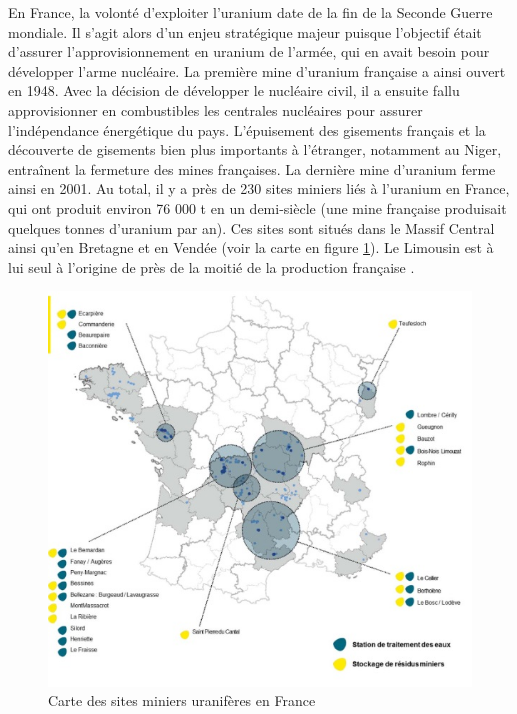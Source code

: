 \documentclass{article}
\begin{document}
En France, la volonté d’exploiter l’uranium date de la fin de la Seconde Guerre mondiale. Il s’agit alors d’un enjeu stratégique majeur puisque l’objectif était d’assurer l’approvisionnement en uranium de l’armée, qui en avait besoin pour développer l’arme nucléaire. La première mine d’uranium française a ainsi ouvert en 1948. Avec la décision de développer le nucléaire civil, il a ensuite fallu approvisionner en combustibles les centrales nucléaires pour assurer l’indépendance énergétique du pays. L’épuisement des gisements français et la découverte de gisements bien plus importants à l’étranger, notamment au Niger, entraînent la fermeture des mines françaises. La dernière mine d’uranium ferme ainsi en 2001. Au total, il y a près de 230 sites miniers liés à l’uranium en France, qui ont produit environ 76 000 t en un demi-siècle (une mine française produisait quelques tonnes d’uranium par an). Ces sites sont situés dans le Massif Central ainsi qu’en Bretagne et en Vendée (voir la carte en figure \ref{fig:sites_orano}). Le Limousin est à lui seul à l’origine de près de la moitié de la production française \cite{descostes_introduction_2020}.

\begin{figure}[!h]
    \centering
    \includegraphics[width=\linewidth]{I_A_2.jpg}
    \caption{Carte des sites miniers uranifères en France}
    \label{fig:sites_orano}
\end{figure}
\end{document}
